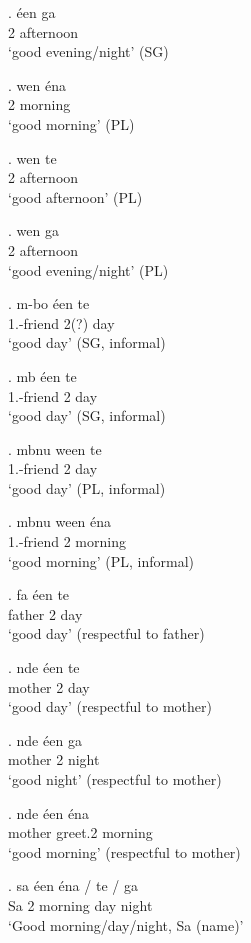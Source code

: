 \documentclass{assets/fieldnotes}
\begin{document}
\exg. éen ga\\
2 afternoon\\
`good evening/night' (SG)

\exg. wen éna\\
2 morning\\
`good morning' (PL)

\exg. wen te\\
2 afternoon\\
`good afternoon' (PL)

\exg. wen ga\\
2 afternoon\\
`good evening/night' (PL)


\exg. m-bo éen te\\
1\Sg{}.\Poss{}-friend 2\Sg{}(?) day\\
`good day' (SG, informal) 

\exg. mb éen te\\
1\Sg{}.\Poss{}-friend 2\Sg{} day\\
`good day' (SG, informal)

\exg. mbnu ween te\\
1\Sg{}.\Poss{}-friend 2\Sg{} day\\
`good day' (PL, informal)

\exg. mbnu ween éna\\
1\Sg{}.\Poss{}-friend 2\Pl{} morning\\
`good morning' (PL, informal)

\exg. fa éen te\\
father 2\Sg{} day\\
`good day' (respectful to father)

\exg. nde éen te\\
mother 2\Sg{} day\\
`good day' (respectful to mother)

\exg. nde éen ga\\
mother 2\Sg{} night\\
`good night' (respectful to mother)

\exg. nde éen éna\\
mother greet.2\Sg{} morning\\
`good morning' (respectful to mother)

\exg. sa éen éna / te / ga\\
Sa 2\Sg{} morning {} day {} night\\
`Good morning/day/night, Sa (name)'
\end{document}
